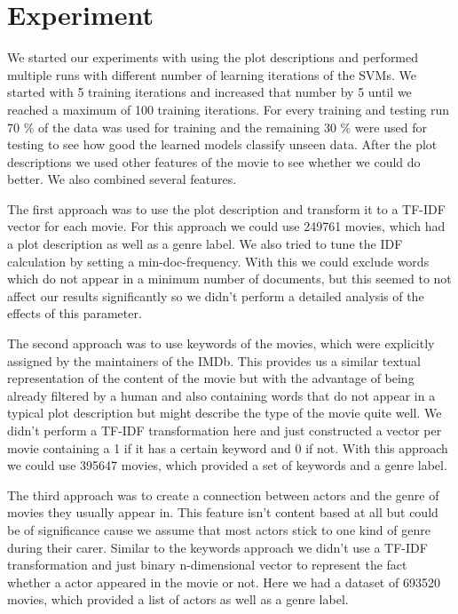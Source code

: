 \documentclass{vldb}
\begin{document}
\section{Experiment}


\par We started our experiments with using the plot descriptions and performed multiple runs with different number of learning iterations of the SVMs. We started with 5 training iterations and increased that number by 5 until we reached a maximum of 100 training iterations. For every training and testing run 70 \% of the data was used for training and the remaining 30 \% were used for testing to see how good the learned models classify unseen data. After the plot descriptions we used other features of the movie to see whether we could do better. We also combined several features.

\par The first approach was to use the plot description and transform it to a TF-IDF vector for each movie. For this approach we could use 249761 movies, which had a plot description as well as a genre label. We also tried to tune the IDF calculation by setting a min-doc-frequency. With this we could exclude words which do not appear in a minimum number of documents, but this seemed to not affect our results significantly so we didn't perform a detailed analysis of the effects of this parameter.

\par The second approach was to use keywords of the movies, which were explicitly assigned by the maintainers of the IMDb. This provides us a similar textual representation of the content of the movie but with the advantage of being already filtered by a human and also containing words that do not appear in a typical plot description but might describe the type of  the movie quite well. We didn’t perform a TF-IDF transformation here and just constructed a vector per movie containing a 1 if it has a certain keyword and 0 if not. With this approach we could use 395647 movies, which provided a set of keywords and a genre label.

\par The third approach was to create a connection between actors and the genre of movies they usually appear in. This feature isn’t content based at all but could be of significance cause we assume that most actors stick to one kind of genre during their carer. Similar to the keywords approach we didn’t use a TF-IDF transformation and just binary n-dimensional vector to represent the fact whether a actor appeared in the movie or not. Here we had a dataset of 693520 movies, which provided a list of actors as well as a genre label.
\end{document}
